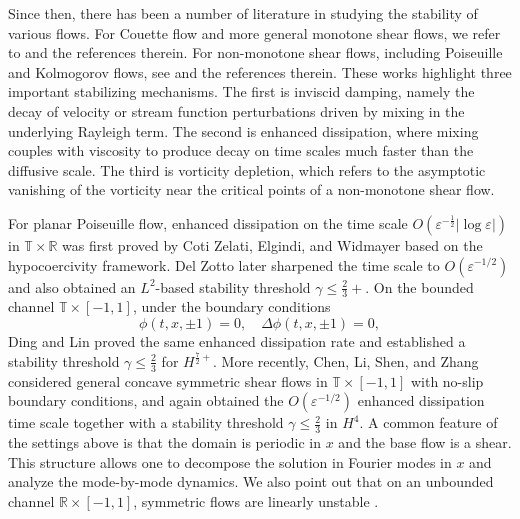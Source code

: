 \documentclass[reqno, 11pt]{amsart}
\theoremstyle{plain}
\theoremstyle{definition}
\theoremstyle{remark}
\numberwithin{equation}{section}
\newcommand{\bR}{\mathbb{R}}
\newcommand{\bT}{\mathbb{T}}
\begin{document}
Since then, there has been a number of literature in studying the stability of various flows. For Couette flow and more general monotone shear flows, we refer to \cites{Bedrossian-Vicol-Wang18, Chen-Li-Wei-Zhang20, Bedrossian-Germain-Masmoudi20, Bedrossian-Germain-Masmoudi22, Masmoudi-Zhao22, Chen-Wei-Zhang23a, Deng-Masmoudi23, Bian-Grenier-Masmoudi-Zhao25, Bedrossian-He-Iyer-Wang25, Bedrossian-He-Iyer-Li-Wang25} and the references therein. For non-monotone shear flows, including Poiseuille and Kolmogorov flows, see \cites{Wei-Zhang-Zhao19, Wei-Zhang-Zhao20, Li-Wei-Zhang20, Chen-Wei-Zhang23b, Chen-Ding-Lin-Zhang23, Chen-Jia-Wei-Zhang25, Beekie-Chen-Jia26} and the references therein. These works highlight three important stabilizing mechanisms. The first is inviscid damping, namely the decay of velocity or stream function perturbations driven by mixing in the underlying Rayleigh term. The second is enhanced dissipation, where mixing couples with viscosity to produce decay on time scales much faster than the diffusive scale. The third is vorticity depletion, which refers to the asymptotic vanishing of the vorticity near the critical points of a non-monotone shear flow.

For planar Poiseuille flow, enhanced dissipation on the time scale $O(\varepsilon^{-\frac{1}{2}}|\log \varepsilon|)$ in $\bT \times \bR$ was first proved by Coti Zelati, Elgindi, and Widmayer \cite{CotiZelati-Elgindi-Widmayer20} based on the hypocoercivity framework. Del Zotto \cite{Zotto23} later sharpened the time scale to $O(\varepsilon^{-1/2})$ and also obtained an $L^2$-based stability threshold $\gamma \le \frac{2}{3}+$. On the bounded channel $\bT \times [-1,1]$, under the boundary conditions 
$$\phi(t,x,\pm 1) = 0, \quad \Delta \phi (t,x,\pm 1) = 0,$$ Ding and Lin \cite{Ding-Lin25} proved the same enhanced dissipation rate and established a stability threshold $\gamma \le \frac{2}{3}$ for $H^{\frac{7}{2}+}$. More recently, Chen, Li, Shen, and Zhang \cite{Chen-Li-Shen-Zhang25} considered general concave symmetric shear flows in $\bT \times [-1,1]$ with no-slip boundary conditions, and again obtained the $O(\varepsilon^{-1/2})$ enhanced dissipation time scale together with a stability threshold $\gamma \le \frac{2}{3}$ in $H^{4}$. A common feature of the settings above is that the domain is periodic in $x$ and the base flow is a shear. This structure allows one to decompose the solution in Fourier modes in $x$ and analyze the mode-by-mode dynamics. We also point out that on an unbounded channel $\bR \times [-1,1]$, symmetric flows are linearly unstable \cite{Grenier-Guo-Toan16}.
\end{document}
